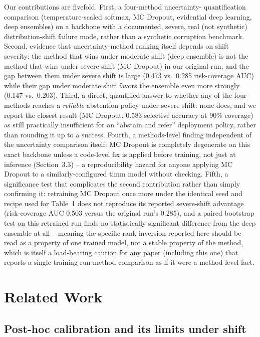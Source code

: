 \documentclass[runningheads]{llncs}
\begin{document}
Our contributions are fivefold. First, a four-method uncertainty-
quantification comparison (temperature-scaled softmax, MC Dropout,
evidential deep learning, deep ensembles) on a backbone with a documented,
severe, real (not synthetic) distribution-shift failure mode, rather than
a synthetic corruption benchmark. Second, evidence that uncertainty-method
ranking itself depends on shift severity: the method that wins under
moderate shift (deep ensemble) is not the method that wins under severe
shift (MC Dropout) in our original run, and the gap between them under
severe shift is large (0.473 vs.\ 0.285 risk-coverage AUC) while their gap
under moderate shift favors the ensemble even more strongly (0.147 vs.\
0.203). Third, a direct, quantified answer to whether any of the four
methods reaches a \emph{reliable} abstention policy under severe shift:
none does, and we report the closest result (MC Dropout, 0.583 selective
accuracy at 90\% coverage) as still practically insufficient for an
``abstain and refer'' deployment policy, rather than rounding it up to a
success. Fourth, a methods-level finding independent of the uncertainty
comparison itself: MC Dropout is completely degenerate on this exact
backbone unless a code-level fix is applied before training, not just at
inference (Section~3.3) -- a reproducibility hazard for anyone applying MC
Dropout to a similarly-configured timm model without checking. Fifth, a
significance test that complicates the second contribution rather than
simply confirming it: retraining MC Dropout once more under the identical
seed and recipe used for Table~1 does not reproduce its reported
severe-shift advantage (risk-coverage AUC 0.503 versus the original run's
0.285), and a paired bootstrap test on this retrained run finds no
statistically significant difference from the deep ensemble at all --
meaning the specific rank inversion reported here should be read as a
property of one trained model, not a stable property of the method,
which is itself a load-bearing caution for any paper (including this one)
that reports a single-training-run method comparison as if it were a
method-level fact.

\section{Related Work}

\subsection{Post-hoc calibration and its limits under shift}
\end{document}
